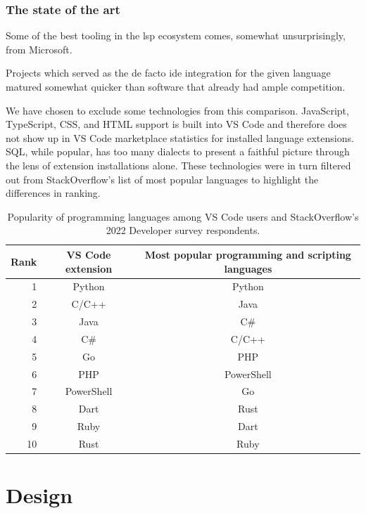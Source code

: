 \subsection{The state of the art}

Some of the best tooling in the \acrshort{lsp} ecosystem comes, somewhat
unsurprisingly, from Microsoft.

Projects which served as the de facto \acrshort{ide} integration for the given
language matured somewhat quicker than software that already had ample
competition.


We have chosen to exclude some technologies from this comparison. JavaScript,
TypeScript, CSS, and HTML support is built into VS Code and therefore does not
show up in VS Code marketplace statistics for installed language extensions.
SQL, while popular, has too many dialects to present a faithful picture through
the lens of extension installations alone. These technologies were in turn
filtered out from StackOverflow's list of most popular languages to highlight
the differences in ranking.


\begin{table}\centering
\caption{Popularity of programming languages among VS Code users and
StackOverflow's 2022 Developer survey\cite{stackoverflow_survey_2022}
respondents.}
\begin{tabular}{|r|c|c|}
	Rank & VS Code extension & Most popular programming and scripting languages
	\tabularnewline \hline
	1  & Python     & Python     \tabularnewline
	2  & C/C++      & Java       \tabularnewline
	3  & Java       & C\#        \tabularnewline
	4  & C\#        & C/C++      \tabularnewline
	5  & Go         & PHP        \tabularnewline
	6  & PHP        & PowerShell \tabularnewline
	7  & PowerShell & Go         \tabularnewline
	8  & Dart       & Rust       \tabularnewline
	9  & Ruby       & Dart       \tabularnewline
	10 & Rust       & Ruby       \tabularnewline
\end{tabular}
\end{table}



\chapter{Design}

